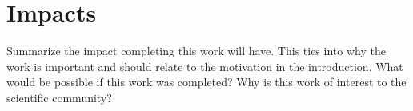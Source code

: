 \section{Impacts}
\label{sec:impact}

Summarize the impact completing this work will have. This ties into why the
work is important and should relate to the motivation in the introduction.
What would be possible if this work was completed? Why is this work of
interest to the scientific community?
